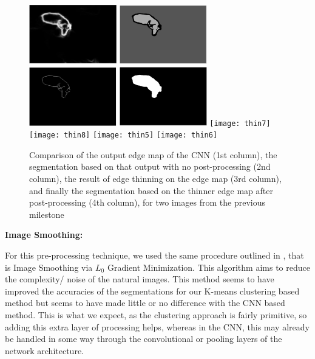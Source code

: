 \documentclass[11pt, twoside]{article}
\begin{document}
\begin{figure}[ht]
    \centering
    \includegraphics[width=1.5in]{thin1}
    \includegraphics[width=1.5in]{thin2}
    \includegraphics[width=1.5in]{thin3}
    \includegraphics[width=1.5in]{thin4}    
    \texttt{[image: thin7]}
    \texttt{[image: thin8]}
    \texttt{[image: thin5]}
    \texttt{[image: thin6]}

    \caption{Comparison of the output edge map of the CNN (1st column), the segmentation based on that output with no post-processing (2nd column), the result of edge thinning on the edge map (3rd column), and finally the segmentation based on the thinner edge map after post-processing (4th column), for two images from the previous milestone}
    \label{fig:reg1}
\end{figure}


\textbf{Image Smoothing:}

For this pre-processing technique, we used the same procedure outlined in \cite{Xu}, that is Image Smoothing via $L_0$ Gradient Minimization. This algorithm aims to reduce the complexity/ noise of the natural images. This method seems to have improved the accuracies of the segmentations for our K-means clustering based method but seems to have made little or no difference with the CNN based method. This is what we expect, as the clustering approach is fairly primitive, so adding this extra layer of processing helps, whereas in the CNN, this may already be handled in some way through the convolutional or pooling layers of the network architecture. 
\end{document}
